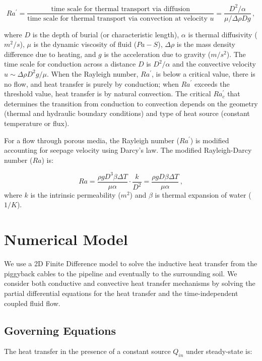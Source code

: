 \documentclass[Journal,letterpaper,InsideFigs]{ascelike-new}
\begin{document}
\begin{equation}
Ra^\prime = \frac{\text{time scale for thermal transport via diffusion}}{\text{time scale for thermal transport via convection at velocity }u} = \frac{D^2/\alpha}{\mu/\Delta \rho D g} \,,
\end{equation}

where $D$ is the depth of burial (or characteristic length), $\alpha$ is thermal diffusivity ($m^2/s$), $\mu$ is the dynamic viscosity of fluid ($Pa-S$), $\Delta \rho$ is the mass density difference due to heating, and $g$ is the acceleration due to gravity ($m/s^2$). The time scale for conduction across a distance $D$ is $D^2/\alpha$ and the convective velocity $u \sim \Delta \rho D^2 g / \mu$. When the Rayleigh number, $Ra^\prime$, is below a critical value, there is no flow, and heat transfer is purely by conduction; when $Ra^\prime$ exceeds the threshold value, heat transfer is by natural convection. The critical $Ra_c^\prime$ that determines the transition from conduction to convection depends on the geometry (thermal and hydraulic boundary conditions) and type of heat source (constant temperature or flux). 

For a flow through porous media, the Rayleigh number ($Ra^\prime$) is modified accounting for seepage velocity using Darcy's law. The modified Rayleigh-Darcy number ($Ra$) is:

\begin{equation}
Ra = \frac{\rho g D^3 \beta \Delta T}{\mu \alpha} \cdot \frac{k}{D^2} = \frac{\rho g D \beta \Delta T}{\mu \alpha}\,,
\end{equation}
where $k$ is the intrinsic permeability ($m^2$) and $\beta$ is thermal expansion of water ($1/K$). 

\section{Numerical Model}
We use a 2D Finite Difference model to solve the inductive heat transfer from the piggyback cables to the pipeline and eventually to the surrounding soil. We consider both conductive and convective heat transfer mechanisms by solving the partial differential equations for the heat transfer and the time-independent coupled fluid flow. 

\subsection*{Governing Equations} 
The heat transfer in the presence of a constant source $Q_{in}$ under steady-state is: 
\end{document}
